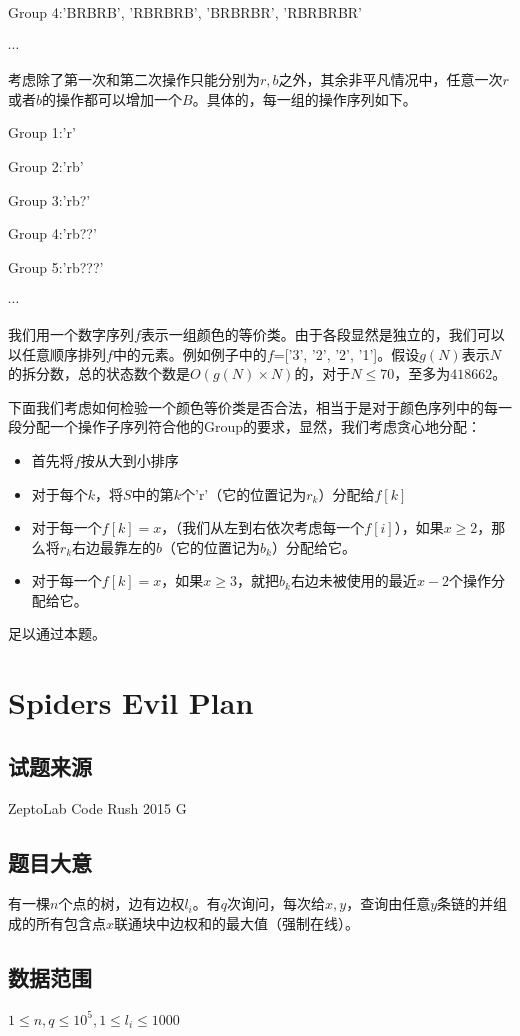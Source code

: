 \documentclass[12pt]{article}
\begin{document}
Group 4:'BRBRB', 'RBRBRB', 'BRBRBR', 'RBRBRBR'

$\cdots$

考虑除了第一次和第二次操作只能分别为$r,b$之外，其余非平凡情况中，任意一次$r$或者$b$的操作都可以增加一个$B$。具体的，每一组的操作序列如下。

Group 1:'r'

Group 2:'rb'

Group 3:'rb?'

Group 4:'rb??'

Group 5:'rb???'

$\cdots$

我们用一个数字序列$f$表示一组颜色的等价类。由于各段显然是独立的，我们可以以任意顺序排列$f$中的元素。例如例子中的$f$=['3', '2', '2', '1']。假设$g(N)$表示$N$的拆分数，总的状态数个数是$O(g(N)\times N)$的，对于$N\le 70$，至多为$418662$。

下面我们考虑如何检验一个颜色等价类是否合法，相当于是对于颜色序列中的每一段分配一个操作子序列符合他的Group的要求，显然，我们考虑贪心地分配：
\begin{itemize}
  \item 首先将$f$按从大到小排序
  \item 对于每个$k$，将$S$中的第$k$个'r'（它的位置记为$r_k$）分配给$f[k]$
  \item 对于每一个$f[k]=x$，（我们从左到右依次考虑每一个$f[i]$），如果$x\ge 2$，那么将$r_k$右边最靠左的$b$（它的位置记为$b_k$）分配给它。
  \item 对于每一个$f[k]=x$，如果$x\ge 3$，就把$b_k$右边未被使用的最近$x-2$个操作分配给它。
\end{itemize}

足以通过本题。

\newpage

\section{Spiders Evil Plan}
\subsection{试题来源}
ZeptoLab Code Rush 2015  G
\subsection{题目大意}
有一棵$n$个点的树，边有边权$l_i$。有$q$次询问，每次给$x,y$，查询由任意$y$条链的并组成的所有包含点$x$联通块中边权和的最大值（强制在线）。

\subsection{数据范围}
$1\le n, q\le 10^5, 1\le l_i \le 1000$
\end{document}
